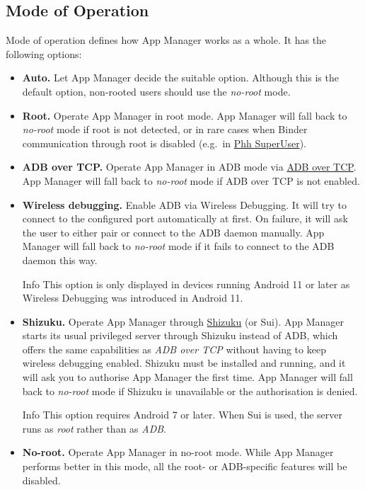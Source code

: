 \subsection{Mode of Operation}\label{subsec:mode-of-operation} %
Mode of operation defines how App Manager works as a whole. It has the following options:
\begin{itemize}
    \item \textbf{Auto.} Let App Manager decide the suitable option.
    Although this is the default option, non-rooted users should use the \textit{no-root} mode.

    \item \textbf{Root.} Operate App Manager in root mode. App Manager will fall back to \textit{no-root} mode if root
    is not detected, or in rare cases when Binder communication through root is disabled (e.g.\ in \href{https://github.com/MuntashirAkon/AppManager/issues/606}{Phh SuperUser}).

    \item \textbf{ADB over TCP.} Operate App Manager in ADB mode via \hyperref[sec:adb-over-tcp]{ADB over TCP}.
    App Manager will fall back to \textit{no-root} mode if ADB over TCP is not enabled.

    \item \textbf{Wireless debugging.} Enable ADB via Wireless Debugging. It will try to connect to the configured port
    automatically at first. On failure, it will ask the user to either pair or connect to the ADB daemon manually.
    App Manager will fall back to \textit{no-root} mode if it fails to connect to the ADB daemon this way.
    \begin{tip}{Info}
        This option is only displayed in devices running Android 11 or later as Wireless Debugging was introduced in Android 11.
    \end{tip}

    \item \textbf{Shizuku.} Operate App Manager through \href{https://shizuku.rikka.app}{Shizuku} (or Sui). App Manager
    starts its usual privileged server through Shizuku instead of ADB, which offers the same capabilities as
    \textit{ADB over TCP} without having to keep wireless debugging enabled. Shizuku must be installed and running,
    and it will ask you to authorise App Manager the first time. App Manager will fall back to \textit{no-root} mode
    if Shizuku is unavailable or the authorisation is denied.
    \begin{tip}{Info}
        This option requires Android 7 or later. When Sui is used, the server runs as \textit{root} rather than as
        \textit{ADB}.
    \end{tip}

    \item \textbf{No-root.} Operate App Manager in no-root mode. While App Manager performs better in this mode,
    all the root- or ADB-specific features will be disabled.
\end{itemize}

